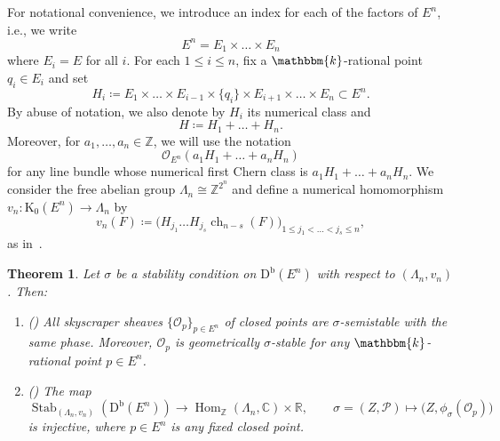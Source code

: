 \documentclass[11pt, reqno]{amsart}
\numberwithin{equation}{section}
\theoremstyle{plain}
\newtheorem{theorem}{Theorem}[section]
\theoremstyle{remark}
\theoremstyle{definition}
\theoremstyle{italicsname}
\newcommand{\Db}{\mathrm{D^b}}
\DeclareMathOperator{\Stab}{Stab}
\DeclareMathOperator{\Hom}{Hom}
\DeclareMathOperator{\ch}{{ch}}
\newcommand{\cO}{\mathcal{O}}
\newcommand{\cP}{\mathscr{P}}
\newcommand{\rK}{\mathrm{K}}
\newcommand{\KK}{\mathbbm{k}}
\def\CC{\ensuremath{\mathbb{C}}}
\def\RR{\ensuremath{\mathbb{R}}}
\def\ZZ{\ensuremath{\mathbb{Z}}}
\begin{document}
For notational convenience, we introduce an index for each of the factors of $E^n$, i.e., we write 
\begin{equation*}
    E^n = E_1 \times \dots \times E_n
\end{equation*}
where $E_i = E$ for all $i$. 
For each $1\le i\le n$, fix a $\KK$-rational point $q_i\in E_i$ and set
\[
H_i \coloneqq
E_1\times \dots \times E_{i-1}\times \{q_i\}\times E_{i+1}\times \dots
\times E_n
\subset E^n .
\]
By abuse of notation, we also denote by $H_i$ its numerical class and
\begin{equation}
\label{equation-H}
    H \coloneqq H_1+\dots+H_n .
\end{equation}
Moreover, for $a_1,\dots,a_n\in\ZZ$, we will use the notation
\begin{equation}\label{eq:LineBundleH}
\cO_{E^n}(a_1H_1+\dots+a_nH_n)
\end{equation}
for any line bundle whose numerical first Chern class is $a_1H_1+\dots+a_nH_n$.
We consider the free abelian group $\Lambda_n\cong\ZZ^{2^n}$ and define a numerical homomorphism $v_n\colon\rK_0(E^n)\to\Lambda_n$ by 
\begin{equation*}
\label{v-elliptic-curve}
v_n(F)\coloneqq\bigl(H_{j_1}\dots H_{j_s} \ch_{n-s}(F)\bigr)_{1\le j_1<\dots<j_s\le n}, 
\end{equation*}
as in~\cite[Section 4.2]{curves}. 

\begin{theorem}\label{thm:Eninj}
Let $\sigma$ be a stability condition on $\Db(E^n)$ with respect to $(\Lambda_n,v_n)$. 
Then:
\begin{enumerate}[{\rm (1)}]
\item\textup{({\cite[Theorem~1.1 and Proposition~2.9]{FLZ:Albanese}})}\label{enum:Eninj1}
All skyscraper sheaves $\{\cO_p\}_{p\in E^n}$ of closed points are $\sigma$-semistable with the same phase. Moreover, $\cO_p$ is geometrically $\sigma$-stable for any $\KK$-rational point $p\in E^n$.
\item\textup{({\cite[Theorem 1.1]{curves}})}\label{enum:Eninj2}
The map
\begin{equation*}\label{eq35}
\Stab_{(\Lambda_n,v_n)}(\Db(E^n))\longrightarrow
\Hom_\ZZ(\Lambda_n,\CC)\times \RR,
\qquad
\sigma=(Z,\cP)\longmapsto \bigl(Z,\phi_\sigma(\cO_p)\bigr)
\end{equation*}
is injective, where $p \in E^n$ is any fixed closed point. 
\end{enumerate}
\end{theorem}
\end{document}
